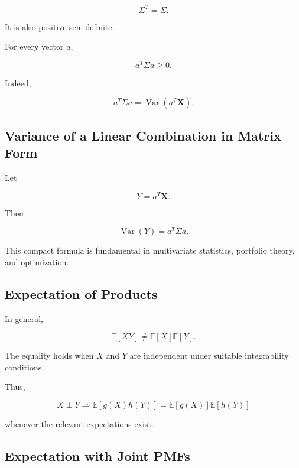 \[
\boxed{
\Sigma^T=\Sigma.
}
\]

It is also positive semidefinite.

For every vector \(a\),

\[
\boxed{
a^T\Sigma a\geq0.
}
\]

Indeed,

\[
a^T\Sigma a
=
\operatorname{Var}(a^T\mathbf{X}).
\]

\subsection{Variance of a Linear Combination in Matrix Form}
\label{subsec:variance-matrix-form}

Let

\[
Y=a^T\mathbf{X}.
\]

Then

\[
\boxed{
\operatorname{Var}(Y)
=
a^T\Sigma a.
}
\]

This compact formula is fundamental in multivariate statistics,
portfolio theory, and optimization.

\subsection{Expectation of Products}
\label{subsec:expectation-products}

In general,

\[
\boxed{
\mathbb{E}[XY]
\neq
\mathbb{E}[X]\mathbb{E}[Y].
}
\]

The equality holds when \(X\) and \(Y\) are independent under suitable
integrability conditions.

Thus,

\[
\boxed{
X\perp Y
\Longrightarrow
\mathbb{E}[g(X)h(Y)]
=
\mathbb{E}[g(X)]
\mathbb{E}[h(Y)]
}
\]

whenever the relevant expectations exist.

\subsection{Expectation with Joint PMFs}
\label{subsec:joint-expectation-discrete}

